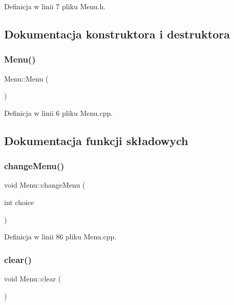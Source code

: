 Definicja w linii 7 pliku Menu.\+h.



\subsection{Dokumentacja konstruktora i destruktora}
\mbox{\label{class_menu_ad466dd83355124a6ed958430450bfe94}} 
\subsubsection{\texorpdfstring{Menu()}{Menu()}}
{\footnotesize\ttfamily Menu\+::\+Menu (\begin{DoxyParamCaption}{ }\end{DoxyParamCaption})}



Definicja w linii 6 pliku Menu.\+cpp.



\subsection{Dokumentacja funkcji składowych}
\mbox{\label{class_menu_a55609527292757ffa53fdfc6c2a23a38}} 
\subsubsection{\texorpdfstring{change\+Menu()}{changeMenu()}}
{\footnotesize\ttfamily void Menu\+::change\+Menu (\begin{DoxyParamCaption}\item[{int}]{choice }\end{DoxyParamCaption})}



Definicja w linii 86 pliku Menu.\+cpp.

\mbox{\label{class_menu_a3630ce145aab68961ec535762d928558}} 
\subsubsection{\texorpdfstring{clear()}{clear()}}
{\footnotesize\ttfamily void Menu\+::clear (\begin{DoxyParamCaption}{ }\end{DoxyParamCaption})}




